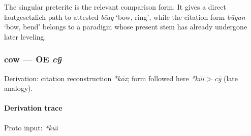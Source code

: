 \documentclass[
  british,
  a4paper,
]{article}
\begin{document}
The singular preterite is the relevant comparison form. It gives a
direct lautgesetzlich path to attested {\emph{bēag}} `bow, ring', while
the citation form {\emph{būgan}} `bow, bend' belongs to a paradigm whose
present stem has already undergone later leveling.

\subsubsection{\texorpdfstring{cow --- OE
\emph{cȳ}}{cow --- OE cȳ}}\label{cow-oe-cux233}

Derivation: citation reconstruction \emph{*kōz}; form followed here
\emph{*kūi} \textgreater{} \emph{cȳ} (late analogy).

\paragraph{Derivation trace}\label{derivation-trace-125}

Proto input: \emph{*kūi}

\begingroup
\setlength{\fboxsep}{6pt}

\noindent{} \endgroup
\end{document}
